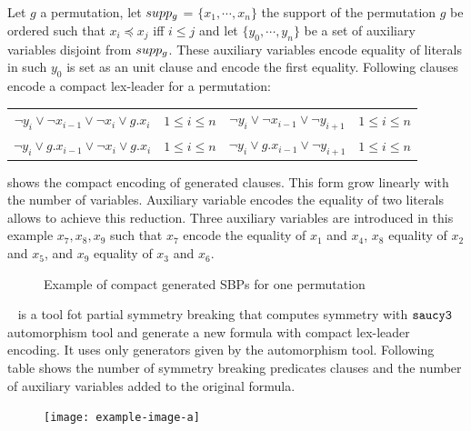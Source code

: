  Let $g$ a permutation, let $supp_g$ = $\{x_1, \cdots, x_n\}$ the support of the permutation $g$ be ordered 
 such that $x_i \preceq x_j$ iff $i \leq j$  and let $\{y_0,\cdots, y_{n} \}$ be a set of auxiliary variables
 disjoint from $supp_g$. These auxiliary variables encode equality of literals in such $y_0$ is set as an unit clause
 and encode the first equality.
 Following clauses encode a compact lex-leader for a permutation:
 

\begin{center}
\begin{tabular}{cc|cc}
	$\neg y_i \lor \neg x_{i-1} \lor \neg x_i \lor g.x_i$ & $1 \leq i \leq n$ & $ \neg y_i \lor \neg x_{i-1} \lor \neg y_{i+1}$ & $1 \leq i \leq n$ \\
	$\neg y_i \lor  g.x_{i-1} \lor \neg x_i \lor g.x_i$ & $1 \leq i \leq n$ & $ \neg y_i \lor g.x_{i-1} \lor \neg y_{i+1}$ & $1 \leq i \leq n$ \\
	
\end{tabular}
\end{center}



 shows the compact encoding of generated clauses. This form grow linearly with the number of variables.
Auxiliary variable encodes the equality of two literals allows to achieve this reduction. Three auxiliary variables are introduced
in this example $x_7, x_8, x_9$ such that $x_7$ encode the equality of $x_1$ and $x_4$, $x_8$ equality of $x_2$ and $x_5$, and $x_9$ equality of $x_3$ and $x_6$.

 \begin{figure}[!htbp]
	
	\caption{Example of compact generated SBPs for one permutation}
	\label{fig:esbp_compact_gen}
\end{figure}


\shatter~\cite{aloul06} is a tool fot partial symmetry breaking that computes symmetry with $\texttt{saucy3}$ automorphism tool and generate a new formula with compact lex-leader encoding. It uses only generators given by the automorphism tool. Following table shows the number of symmetry breaking predicates clauses and the
number of auxiliary variables added to the original formula.


\begin{figure}[!htbp]
	\centering
	\texttt{[image: example-image-a]}
	\label{}
\end{figure}



